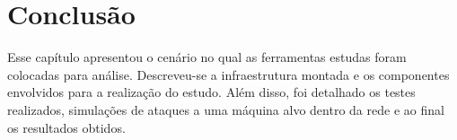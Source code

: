 \section{Conclusão} \label{sec:conclusão}

Esse capítulo apresentou o cenário no qual as ferramentas estudas foram colocadas para análise. Descreveu-se a infraestrutura montada e os componentes envolvidos para a realização do estudo. Além disso, foi detalhado os testes realizados, simulações de ataques a uma máquina alvo dentro da rede e ao final os resultados obtidos. 
